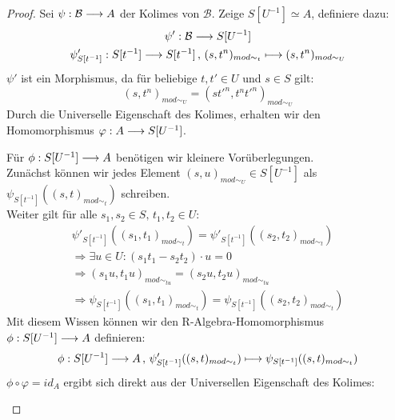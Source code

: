 \documentclass[10pt,a4paper]{report}
\newcommand{\comment}[1]{}
\newcommand{\functionfront}[3]{\nolinebreak{#1:#2 \longrightarrow #3}}
\newcommand{\function}[5]{\nolinebreak{#1:#2 \longrightarrow #3 \, , \, #4 \longmapsto #5}}
\newcommand{\lok}[2]{#1 [#2^{-1}]}
\newcommand{\loke}[3]{(#1,#2)_{mod\sim_{#3}}}
\begin{document}
\begin{proof}
Sei $\functionfront{\psi}{\mathcal{B}}{A}$ der Kolimes von $\mathcal{B}$. Zeige $\lok{S}{U} \simeq A$, definiere dazu:
\begin{gather*}
\functionfront{\psi'}{\mathcal{B}}{\lok{S}{U}}\\
\function{\psi'_{\lok{S}{t}}}{\lok{S}{t}}{\lok{S}{t}}{\loke{s}{t^n}{t}}{\loke{s}{t^n}{U}}
\end{gather*}
$\psi'$ ist ein Morphismus, da für beliebige $t,t' \in U$ und $s \in S$ gilt:
$$\loke{s}{t^n}{U} = \loke{st'^n}{t^nt'^n}{U}$$
Durch die Universelle Eigenschaft des Kolimes, erhalten wir den Homomorphismus $\functionfront{\varphi}{A}{\lok{S}{U}}$.
\begin{center}
\end{center}
Für $\functionfront{\phi}{S[U^{-1}]}{A}$ benötigen wir kleinere Vorüberlegungen.\\
Zunächst können wir jedes Element $(s,u)_{mod\sim_{U}} \in \lok{S}{U}$ als $\psi_{\lok{S}{t}}(\loke{s}{t}{t})$ schreiben.\\
\comment{\label{wobei u = t}}
Weiter gilt für alle $s_1,s_2 \in S , \, t_1,t_2 \in U$: 
\begin{align*}
\psi'_{\lok{S}{t}}(\loke{s_1}{t_1}{t}) = \psi'_{\lok{S}{t}}(\loke{s_2}{t_2}{t})\\
\Rightarrow  \exists u \in U: (s_1t_1 - s_2t_2) \cdot u = 0\\
\Rightarrow  \loke{s_1u}{t_1u}{tu} = \loke{s_2u}{t_2u}{tu}\\
\Rightarrow  \psi_{\lok{S}{t}}(\loke{s_1}{t_1}{t}) = \psi_{\lok{S}{t}}(\loke{s_2}{t_2}{t})
\end{align*}
Mit diesem Wissen können wir den R-Algebra-Homomorphismus $\functionfront{\phi}{\lok{S}{U}}{A}$ definieren:
\begin{gather*}
\function{\phi}{\lok{S}{U}}{A}{\psi'_{\lok{S}{t}}(\loke{s}{t}{t})}{\psi_{\lok{S}{t}}(\loke{s}{t}{t})}
\end{gather*}
$\phi \circ \varphi = id_A$ ergibt sich direkt aus der Universellen Eigenschaft des Kolimes:
\begin{center}
\begin{tikzcd}

\end{tikzcd}
\end{center}
\end{proof}
\end{document}
